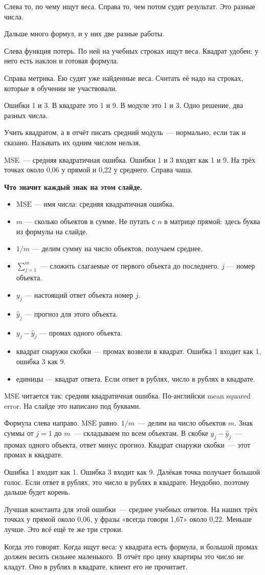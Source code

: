 \documentclass[11pt,a4paper]{article}
\newcommand{\slidehead}[2]{\par\vspace{4mm}{\color{navy}\large\bfseries Слайд #1. #2}\par\vspace{1mm}}
\newcommand{\screen}[1]{\par{\color{ink}\small #1\par}\vspace{1mm}}
\newcommand{\say}[1]{\begin{saybox}#1\end{saybox}}
\newenvironment{signs}{\begin{signbox}{\bfseries Что значит каждый знак на этом слайде.}\par\begin{itemize}[leftmargin=1.15em,itemsep=2pt,topsep=3pt,parsep=0pt]}{\end{itemize}\end{signbox}}
\begin{document}
\slidehead{17}{Две работы}
\screen{Слева то, по чему ищут веса. Справа то, чем потом судят результат. Это разные числа.}
\say{Дальше много формул, и у них две разные работы.

Слева функция потерь. По ней на учебных строках ищут веса. Квадрат удобен: у него есть наклон и готовая формула.

Справа метрика. Ею судят уже найденные веса. Считать её надо на строках, которые в обучении не участвовали.

Ошибки 1 и 3. В квадрате это 1 и 9. В модуле это 1 и 3. Одно решение, два разных числа.

Учить квадратом, а в отчёт писать средний модуль~--- нормально, если так и сказано. Называть их одним числом нельзя.}

\slidehead{18}{MSE}
\screen{MSE~--- средняя квадратичная ошибка. Ошибки 1 и 3 входят как 1 и 9. На трёх точках около 0,06 у прямой и 0,22 у среднего. Справа чаша.}
\begin{signs}
\item \(\mathrm{MSE}\) — имя числа: средняя квадратичная ошибка.
\item \(m\) — сколько объектов в сумме. Не путать с \(n\) в матрице прямой: здесь буква из формулы на слайде.
\item \(1/m\) — делим сумму на число объектов, получаем среднее.
\item \(\sum_{j=1}^{m}\) — сложить слагаемые от первого объекта до последнего. \(j\) — номер объекта.
\item \(y_j\) — настоящий ответ объекта номер \(j\).
\item \(\hat y_j\) — прогноз для этого объекта.
\item \(y_j-\hat y_j\) — промах одного объекта.
\item квадрат снаружи скобки — промах возвели в квадрат. Ошибка 1 входит как 1, ошибка 3 как 9.
\item единицы — квадрат ответа. Если ответ в рублях, число в рублях в квадрате.
\end{signs}
\say{MSE читается так: средняя квадратичная ошибка. По-английски mean squared error. На слайде это написано под буквами.

Формула слева направо. \(\mathrm{MSE}\) равно. \(1/m\)~--- делим на число объектов \(m\). Знак суммы от \(j=1\) до \(m\)~--- складываем по всем объектам. В скобке \(y_j-\hat y_j\)~--- промах одного объекта, ответ минус прогноз. Квадрат снаружи скобки~--- этот промах в квадрате.

Ошибка 1 входит как 1. Ошибка 3 входит как 9. Далёкая точка получает большой голос. Если ответ в рублях, это число в рублях в квадрате. Неудобно, поэтому дальше будет корень.

Лучшая константа для этой ошибки~--- среднее учебных ответов. На наших трёх точках у прямой около 0,06, у фразы «всегда говори 1,67» около 0,22. Меньше лучше. Это всё ещё те же три строки.

Когда это говорят. Когда ищут веса: у квадрата есть формула, и большой промах должен весить сильнее маленького. В отчёт про цену квартиры это число не кладут. Оно в рублях в квадрате, клиент его не прочитает.}
\end{document}
